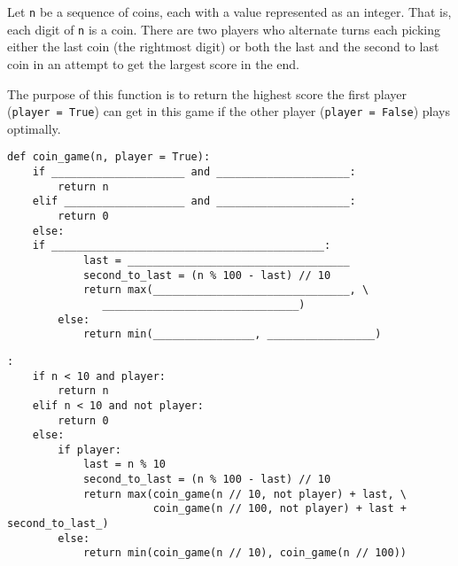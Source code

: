 \begin{blocksection}
\question Let \texttt{n} be a sequence of coins, each with a value represented as an integer. That is, each digit of \texttt{n} is a coin. There are two players who alternate turns each picking either the last coin (the rightmost digit) or both the last and the second to last coin in an attempt to get the largest score in the end. 

The purpose of this function is to return the highest score the first player (\texttt{player = True}) can get in this game if the other player (\texttt{player = False}) plays optimally. \\

\begin{lstlisting}
def coin_game(n, player = True):
    if _____________________ and _____________________:
        return n			
    elif ___________________ and _____________________:		
        return 0			
    else:
	if ___________________________________________:			
            last = ___________________________________			
            second_to_last = (n % 100 - last) // 10
            return max(_______________________________, \
		       _______________________________)
        else:	
            return min(________________, _________________)

\end{lstlisting}

\begin{solution}[1in]
\begin{lstlisting}:
    if n < 10 and player:
        return n
    elif n < 10 and not player:
        return 0
    else:
        if player:
            last = n % 10
            second_to_last = (n % 100 - last) // 10
            return max(coin_game(n // 10, not player) + last, \
                       coin_game(n // 100, not player) + last + second_to_last_)
        else:
            return min(coin_game(n // 10), coin_game(n // 100))

\end{lstlisting}
\end{solution}
\end{blocksection}
